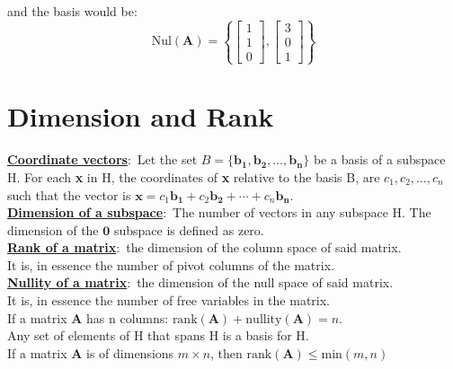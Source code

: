 \documentclass[nobib]{tufte-handout}
\newcommand{\defn}[2]{\underline{\noindent\textbf{#1}}:\ #2}
\begin{document}
and the basis would be:
\begin{equation*}
    \text{Nul}(\mathbf{A})=
    \left\{\begin{bmatrix}
        1 \\
        1 \\
        0
    \end{bmatrix},
    \begin{bmatrix}
        3 \\
        0 \\
        1
    \end{bmatrix}\right\}
\end{equation*}
\section{Dimension and Rank}
\defn{Coordinate vectors}{Let the set $B = \{\mathbf{b_1,b_2,\ldots,b_n}\}$ be a basis of a subspace H.
For each \textbf{x} in H, the coordinates of \textbf{x} relative to the basis B, are $c_1,c_2,\ldots,c_n$ such that the vector is $\mathbf{x} = c_1\mathbf{b_1}+ c_2\mathbf{b_2}+\cdots+ c_n\mathbf{b_n}$.\\}
\defn{Dimension of a subspace}{The number of vectors in any subspace H. The dimension of the $\mathbf{0}$ subspace is defined as zero.\\}
\defn{Rank of a matrix}{the dimension of the column space of said matrix.}\\ It is, in essence the number of pivot columns of the matrix.\\
\defn{Nullity of a matrix}{the dimension of the null space of said matrix.}\\ It is, in essence the number of free variables in the matrix.\\
If a matrix \textbf{A} has n columns: $\text{rank}(\mathbf{A})+\text{nullity}(\mathbf{A})=n$.\\
Any set of elements of H that spans H is a basis for H.\\
If a matrix \textbf{A} is of dimensions $m\times n$, then $\text{rank}(\mathbf{A})\leq \text{min}(m,n)$
\end{document}
